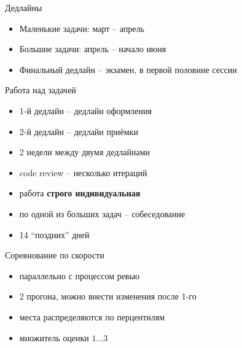 \documentclass[unknownkeysallowed,xcolor=table]{beamer}
\begin{document}
\begin{frame}{Дедлайны}
  \begin{itemize}
    \item Маленькие задачи: март -- апрель \vspace{2em}
    \item Большие задачи: апрель -- начало июня \vspace{2em}
    \item Финальный дедлайн -- экзамен, в первой половине сессии
  \end{itemize}
\end{frame}

\begin{frame}{Работа над задачей}
  \begin{itemize}
    \item 1-й дедлайн -- дедлайн оформления \vspace{1em}
    \item 2-й дедлайн -- дедлайн приёмки \vspace{1em}
    \item 2 недели между двумя дедлайнами \vspace{1em}
    \item code review -- несколько итераций \vspace{1em}
    \item работа \textbf{строго индивидуальная} \vspace{1em}
    \item по одной из больших задач -- собеседование \vspace{1em}
    \item 14 ``поздних'' дней
  \end{itemize}
\end{frame}

\begin{frame}{Соревнование по скорости}
  \begin{itemize}
    \item параллельно с процессом ревью \vspace{1em}
    \item 2 прогона, можно внести изменения после 1-го \vspace{1em}
    \item места распределяются по перцентилям \vspace{1em}
    \item множитель оценки $1 \dotso 3$
  \end{itemize}
\end{frame}
\end{document}
